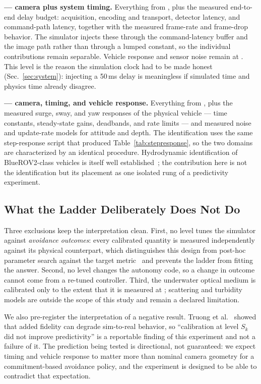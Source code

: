 \textbf{\STWO{} --- camera plus system timing.} Everything from \SONE{},
plus the measured end-to-end delay budget: acquisition, encoding and
transport, detector latency, and command-path latency, together with the
measured frame-rate and frame-drop behavior. The simulator injects these
through the command-latency buffer and the image path rather than through a
lumped constant, so the individual contributions remain separable. Vehicle
response and sensor noise remain at \SZERO{}. This level is the reason the
simulation clock had to be made honest (Sec.~\ref{sec:system}): injecting a
50\,ms delay is meaningless if simulated time and physics time already
disagree. \CALIB

\textbf{\STHREE{} --- camera, timing, and vehicle response.} Everything from
\STWO{}, plus the measured surge, sway, and yaw responses of the physical
vehicle --- time constants, steady-state gains, deadbands, and rate limits ---
and measured noise and update-rate models for attitude and depth. The
identification uses the same step-response script that produced
Table~\ref{tab:stepresponse}, so the two domains are characterized by an
identical procedure. Hydrodynamic identification of BlueROV2-class vehicles
is itself well
established~\cite{benzon2022anopenso,orjales2025towardsa}; the contribution
here is not the identification but its placement as one isolated rung of a
predictivity experiment. \CALIB



\subsection{What the Ladder Deliberately Does Not Do}

Three exclusions keep the interpretation clean. First, no level tunes the
simulator against \emph{avoidance outcomes}: every calibrated quantity is
measured independently against its physical counterpart, which distinguishes
this design from post-hoc parameter search against the target
metric~\cite{kadian2020simrealp} and prevents the ladder from fitting the
answer. Second, no level changes the autonomy code, so a change in outcome
cannot come from a re-tuned controller. Third, the underwater optical medium
is calibrated only to the extent that it is measured at \SONE{}; scattering
and turbidity models are outside the scope of this study and remain a
declared limitation.

We also pre-register the interpretation of a negative result. Truong et
al.~\cite{truong2022rethinki} showed that added fidelity can degrade
sim-to-real behavior, so ``calibration at level $S_k$ did not improve
predictivity'' is a reportable finding of this experiment and not a failure of
it. The prediction being tested is directional, not guaranteed: we expect
timing and vehicle response to matter more than nominal camera geometry for
a commitment-based avoidance policy, and the experiment is designed to be
able to contradict that expectation.

